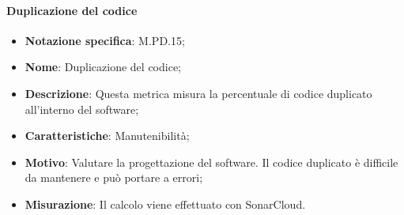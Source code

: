 \paragraph*{Duplicazione del codice}
\begin{itemize}
    \item \textbf{Notazione specifica}: M.PD.15;
    \item \textbf{Nome}: Duplicazione del codice;
    \item \textbf{Descrizione}: Questa metrica misura la percentuale di codice duplicato all'interno del software;
    \item \textbf{Caratteristiche}: Manutenibilità;
    \item \textbf{Motivo}: Valutare la progettazione del software. Il codice duplicato è difficile da mantenere e può portare a errori;
    \item \textbf{Misurazione}: Il calcolo viene effettuato con SonarCloud.
\end{itemize}
